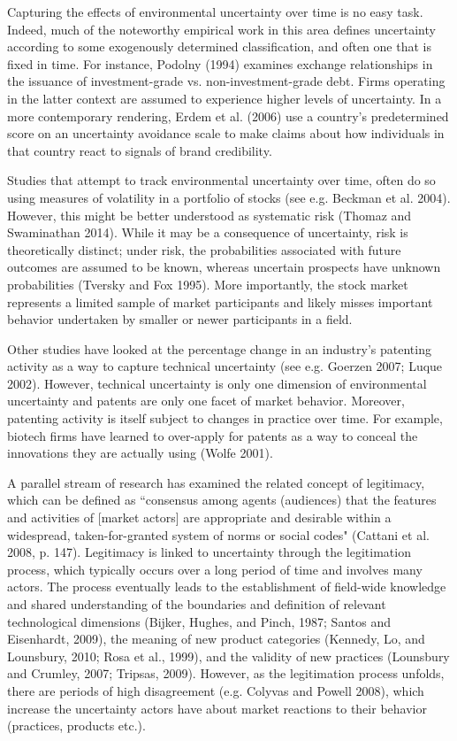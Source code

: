 Capturing the effects of environmental uncertainty over time is no easy task. Indeed, much of the noteworthy empirical work in this area defines uncertainty according to some exogenously determined classification, and often one that is fixed in time. For instance, Podolny (1994) examines exchange relationships in the issuance of investment-grade vs. non-investment-grade debt. Firms operating in the latter context are assumed to experience higher levels of uncertainty. In a more contemporary rendering, Erdem et al. (2006) use a country's predetermined score on an uncertainty avoidance scale to make claims about how individuals in that country react to signals of brand credibility. 

Studies that attempt to track environmental uncertainty over time, often do so using measures of volatility in a portfolio of stocks (see e.g. Beckman et al. 2004). However, this might be better understood as systematic risk (Thomaz and Swaminathan 2014). While it may be a consequence of uncertainty, risk is theoretically distinct; under risk, the probabilities associated with future outcomes are assumed to be known, whereas uncertain prospects have unknown probabilities (Tversky and Fox 1995). More importantly, the stock market represents a limited sample of market participants and likely misses important behavior undertaken by smaller or newer participants in a field. 

Other studies have looked at the percentage change in an industry's patenting activity as a way to capture technical uncertainty (see e.g. Goerzen 2007; Luque 2002). However, technical uncertainty is only one dimension of environmental uncertainty and patents are only one facet of market behavior. Moreover, patenting activity is itself subject to changes in practice over time. For example, biotech firms have learned to over-apply for patents as a way to conceal the innovations they are actually using (Wolfe 2001).

A parallel stream of research has examined the related concept of legitimacy, which can be defined as ``consensus among agents (audiences) that the features and activities of [market actors] are appropriate and desirable within a widespread, taken-for-granted system of norms or social codes" (Cattani et al. 2008, p. 147). Legitimacy is linked to uncertainty through the legitimation process, which typically occurs over a long period of time and involves many actors. The process eventually leads to the establishment of field-wide knowledge and shared understanding of the boundaries and definition of relevant technological dimensions (Bijker, Hughes, and Pinch, 1987; Santos and Eisenhardt, 2009), the meaning of new product categories (Kennedy, Lo, and Lounsbury, 2010; Rosa et al., 1999), and the validity of new practices (Lounsbury and Crumley, 2007; Tripsas, 2009). However, as the legitimation process unfolds, there are periods of high disagreement (e.g. Colyvas and Powell 2008), which increase the uncertainty actors have about market reactions to their behavior (practices, products etc.).

